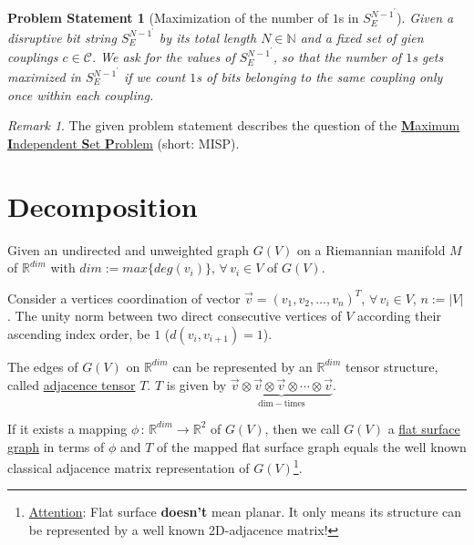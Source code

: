 \documentclass{article}
\newtheorem*{theorem A}{Theorem A}
\newtheorem*{theorem B}{N\"olker's Theorem}
\newtheorem{problem}{Problem Statement}
\theoremstyle{remark}
\newtheorem{remark}{Remark}[section]
\theoremstyle{remark}
\begin{document}
\vspace{0.3cm}
\begin{problem}[Maximization of the number of $1$s in $S^{N-1^{\prime}}_{E}$]
    Given a disruptive bit string $S^{N-1^\prime}_{E}$ by its total length $N \in \mathbb{N}$ and a fixed set of gien couplings $c \in \mathcal{C}$. We ask for the values of $S^{N-1^\prime}_{E}$, so that the number of $1$s gets maximized in $S^{N-1^\prime}_{E}$ if we count $1$s of bits belonging to the same coupling only once within each coupling.
\label{problem:maximizationof1s}
\end{problem}


\vspace{0.3cm}
\begin{remark}
    The given problem statement describes the question of the \underline{\textbf{M}aximum \textbf{I}ndependent \textbf{S}et \textbf{P}roblem} (short: MISP).
\label{remark:MISP}
\end{remark}
\section{Decomposition}
\label{s:decomposition}
Given an undirected and unweighted graph $G\left(V\right)$ on a Riemannian manifold $M$ of $\mathbb{R}^{dim}$ with $dim := max\{ deg\left(v_{i}\right) \}$, $\forall \, v_{i} \in V$ of $G\left(V\right)$.

\vspace{0.3cm}
Consider a vertices coordination of vector $\vec{v} = \left(v_{1}, v_{2}, \dots, v_{n}\right)^{T}$, $\forall \, v_{i} \in V$, $n := |V|$. The unity norm between two direct consecutive vertices of $V$ according their ascending index order, be $1$ ($d\left(v_{i}, v_{i+1}\right) = 1$).

\vspace{0.3cm}
The edges of $G\left(V\right)$ on $\mathbb{R}^{dim}$ can be represented by an $\mathbb{R}^{dim}$ tensor structure, called \underline{adjacence tensor} $T$. $T$ is given by $\underbrace{\vec{v} \otimes \vec{v} \otimes \vec{v} \otimes \cdots \otimes \vec{v}}_{\mathrm{dim-times}}$.

\vspace{0.3cm}
If it exists a mapping $\phi \, : \, \mathbb{R}^{dim} \rightarrow \mathbb{R}^{2}$ of $G\left(V\right)$, then we call $G\left(V\right)$ a \underline{flat surface graph} in terms of $\phi$ and $T$ of the mapped flat surface graph equals the well known classical adjacence matrix representation of $G\left(V\right)$\footnote{\underline{Attention}: Flat surface \textbf{doesn't} mean planar. It only means its structure can be represented by a well known 2D-adjacence matrix!}.
\end{document}
